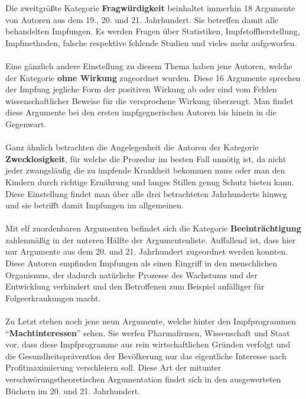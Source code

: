 \documentclass[
    a4paper,
    12pt,
    hyphens,
    chapterprefix=true,
    headheight=33pt,
    footheight=29pt,
    headings=optiontohead,
]{scrartcl}
\begin{document}
{\newpage
Die zweitgrößte Kategorie \textbf{Fragwürdigkeit} beinhaltet immerhin 18 Argumente von Autoren aus dem 19., 20. und 21. Jahrhundert. Sie betreffen damit alle behandelten Impfungen. Es werden Fragen über Statistiken, Impfstoffherstellung, Impfmethoden, falsche respektive fehlende Studien und vieles mehr aufgeworfen. \\
\\
Eine gänzlich andere Einstellung zu diesem Thema haben jene Autoren, welche der Kategorie \textbf{ohne Wirkung} zugeordnet wurden. Diese 16 Argumente sprechen der Impfung jegliche Form der positiven Wirkung ab oder sind vom Fehlen wissenschaftlicher Beweise für die versprochene Wirkung überzeugt. Man  findet diese Argumente bei den ersten impfgegnerischen Autoren bis hinein in die Gegenwart. \\
\\
Ganz ähnlich betrachten die Angelegenheit die Autoren der Kategorie \textbf{Zwecklosigkeit}, für welche die Prozedur im besten Fall unnötig ist, da nicht jeder zwangsläufig die zu impfende Krankheit bekommen muss oder man den Kindern durch richtige Ernährung und langes Stillen genug Schutz bieten kann. Diese Einstellung findet man über alle drei betrachteten Jahrhunderte hinweg und sie betrifft damit Impfungen im allgemeinen.\\
\\
Mit elf zuordenbaren Argumenten befindet sich die Kategorie \textbf{Beeinträchtigung} zahlenmäßig in der unteren Hälfte der Argumentenliste. Auffallend ist, dass hier nur Argumente aus dem 20. und 21. Jahrhundert zugeordnet werden konnten. Diese Autoren empfinden Impfungen als einen Eingriff in den menschlichen Organismus, der dadurch natürliche Prozesse des Wachstums und der Entwicklung verhindert und den Betroffenen zum Beispiel anfälliger für Folgeerkrankungen macht.\\
\\
Zu Letzt stehen noch jene neun Argumente, welche hinter den Impfprogrammen "`\textbf{Machtinteressen}"' sehen. Sie werfen Pharmafirmen, Wissenschaft und Staat vor, dass diese Impfprogramme aus rein wirtschaftlichen Gründen verfolgt und die Gesundheitsprävention der Bevölkerung nur das eigentliche Interesse nach Profitmaximierung verschleiern soll. Diese Art der mitunter verschwörungstheoretischen Argumentation findet sich in den ausgewerteten Büchern im 20. und 21. Jahrhundert.



\newpage
}
\end{document}
